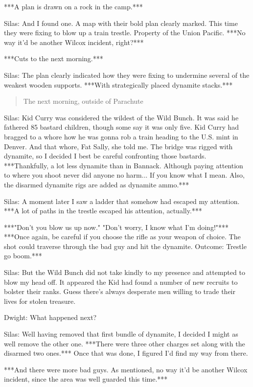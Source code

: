 \documentclass{article}
\begin{document}
***A plan is drawn on a rock in the camp.***

Silas: And I found one. A map with their bold plan clearly marked. This time they were fixing to blow up a train trestle. Property of the Union Pacific. ***No way it'd be another Wilcox incident, right?***

***Cuts to the next morning.***

Silas: The plan clearly indicated how they were fixing to undermine several of the weakest wooden supports. ***With strategically placed dynamite stacks.***

\begin{quote}
    The next morning, outside of Parachute
\end{quote}

Silas: Kid Curry was considered the wildest of the Wild Bunch. It was said he fathered 85 bastard children, though some say it was only five. Kid Curry had bragged to a whore how he was gonna rob a train heading to the U.S. mint in Denver. And that whore, Fat Sally, she told me. The bridge was rigged with dynamite, so I decided I best be careful confronting those bastards. ***Thankfully, a lot less dynamite than in Bannack. Although paying attention to where you shoot never did anyone no harm... If you know what I mean. Also, the disarmed dynamite rigs are added as dynamite ammo.***

Silas: A moment later I saw a ladder that somehow had escaped my attention. ***A lot of paths in the trestle escaped his attention, actually.***

***"Don't you blow us up now." "Don't worry, I know what I'm doing!"*** ***Once again, be careful if you choose the rifle as your weapon of choice. The shot could traverse through the bad guy and hit the dynamite. Outcome: Trestle go boom.***

Silas: But the Wild Bunch did not take kindly to my presence and attempted to blow my head off. It appeared the Kid had found a number of new recruits to bolster their ranks. Guess there's always desperate men willing to trade their lives for stolen treasure.

Dwight: What happened next?

Silas: Well having removed that first bundle of dynamite, I decided I might as well remove the other one. ***There were three other charges set along with the disarmed two ones.*** Once that was done, I figured I'd find my way from there.

***And there were more bad guys. As mentioned, no way it'd be another Wilcox incident, since the area was well guarded this time.***
\end{document}
